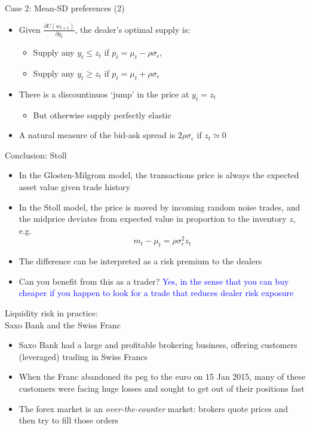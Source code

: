 \documentclass[english,10pt]{beamer}
\begin{document}
\begin{frame}{Case 2: Mean-SD preferences (2)}
	\begin{itemize}
		\item Given $\frac{\partial U(w_{t+1})}{\partial y_t}$, the dealer's optimal supply is:
		\begin{itemize}
			\item Supply any $y_t \leq z_t$ if $p_t = \mu_t - \rho\sigma_{\epsilon}$,
			\item  Supply any $y_t \geq z_t$ if $p_t = \mu_t + \rho\sigma_{\epsilon}$
		\end{itemize}
		\item There is a discountinuos `jump' in the price at $y_t=z_t$
		\begin{itemize}
			\item But otherwise supply perfectly elastic
		\end{itemize}
		\item A natural measure of the bid-ask spread is $2\rho\sigma_{\epsilon}$ if $z_t \simeq 0$
	\end{itemize}
\end{frame}


\begin{frame}{Conclusion: Stoll}
	\begin{itemize}
		\item In the Glosten-Milgrom model, the transactions price is always the expected asset value given trade history
		\item In the Stoll model, the price is moved by incoming random noise trades, and the midprice deviates from expected value in proportion to the inventory $z$, e.g.
		\[
		m_t - \mu_t = \rho \sigma^2_\epsilon z_t
		\]
		\item The difference can be interpreted as a risk premium to the  dealers
		\item Can you benefit from this as a trader? \pause \textcolor{blue}{Yes, in the sense that you can buy cheaper if you happen to look for a trade that reduces dealer risk exposure}
	\end{itemize}
\end{frame}


\begin{frame}{Liquidity risk in practice: \\Saxo Bank and the Swiss Franc}
	\begin{itemize}
		\item Saxo Bank had a  large and profitable brokering business, offering customers (leveraged) trading in Swiss Francs
		\item When the Franc abandoned its peg to the euro on 15 Jan 2015, many of these customers were facing huge losses and sought to get out of their positions fast
		\item The forex market is an \textit{over-the-counter} market: brokers quote prices and then try to fill those orders
	\end{itemize}
\end{frame}
\end{document}
